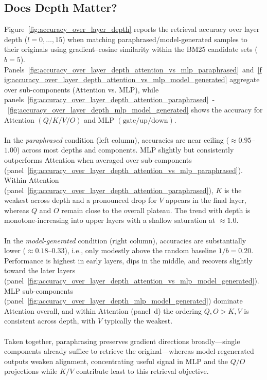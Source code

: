 \subsection{Does Depth Matter?}
Figure~\ref{fig:accuracy_over_layer_depth} reports the retrieval accuracy over layer depth ($l=0,\ldots,15$) when matching paraphrased/model-generated samples to their originals using gradient–cosine similarity within the BM25 candidate sets ($b{=}5$). Panels~\ref{fig:accuracy_over_layer_depth_attention_vs_mlp_paraphrased}~and~\ref{fig:accuracy_over_layer_depth_attention_vs_mlp_model_generated} aggregate over sub-components (Attention vs. MLP), while panels~\ref{fig:accuracy_over_layer_depth_attention_paraphrased}~-~\ref{fig:accuracy_over_layer_depth_mlp_model_generated} shows the accuracy for Attention $(Q/K/V/O)$ and MLP $(\text{gate}/\text{up}/\text{down})$.
\\\\
In the \emph{paraphrased} condition (left column), accuracies are near ceiling ($\approx0.95$–$1.00$) across most depths and components. MLP slightly but consistently outperforms Attention when averaged over sub-components (panel~\ref{fig:accuracy_over_layer_depth_attention_vs_mlp_paraphrased}). Within Attention (panel~\ref{fig:accuracy_over_layer_depth_attention_paraphrased}), $K$ is the weakest across depth and a pronounced drop for $V$ appears in the final layer, whereas $Q$ and $O$ remain close to the overall plateau. The trend with depth is monotone-increasing into upper layers with a shallow saturation at $\approx1.0$.
\\\\
In the \emph{model-generated} condition (right column), accuracies are substantially lower ($\approx0.18$–$0.33$), i.e., only modestly above the random baseline $1/b=0.20$. Performance is highest in early layers, dips in the middle, and recovers slightly toward the later layers (panel~\ref{fig:accuracy_over_layer_depth_attention_vs_mlp_model_generated}). MLP sub-components (panel~\ref{fig:accuracy_over_layer_depth_mlp_model_generated}) dominate Attention overall, and within Attention (panel~d) the ordering $Q,O > K,V$ is consistent across depth, with $V$ typically the weakest.
\\\\
Taken together, paraphrasing preserves gradient directions broadly—single components already suffice to retrieve the original—whereas model-regenerated outputs weaken alignment, concentrating useful signal in MLP and the $Q/O$ projections while $K/V$ contribute least to this retrieval objective.
